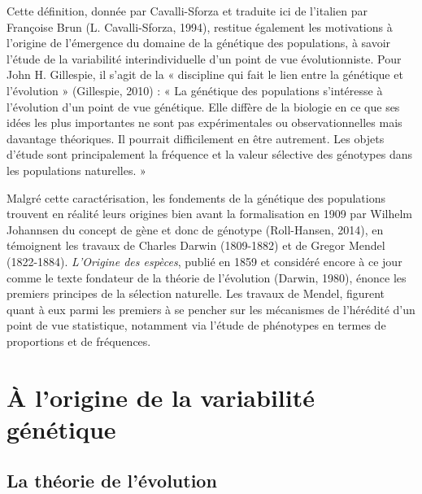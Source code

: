 \documentclass[12pt,twoside]{ugathesis}
\begin{document}
Cette définition, donnée par Cavalli-Sforza et traduite ici de l'italien
par Françoise Brun (L. Cavalli-Sforza, 1994), restitue également les
motivations à l'origine de l'émergence du domaine de la génétique des
populations, à savoir l'étude de la variabilité interindividuelle d'un
point de vue évolutionniste. Pour John H. Gillespie, il s'agit de la «
discipline qui fait le lien entre la génétique et l'évolution »
(Gillespie, 2010) : « La génétique des populations s'intéresse à
l'évolution d'un point de vue génétique. Elle diffère de la biologie en
ce que ses idées les plus importantes ne sont pas expérimentales ou
observationnelles mais davantage théoriques. Il pourrait difficilement
en être autrement. Les objets d'étude sont principalement la fréquence
et la valeur sélective des génotypes dans les populations naturelles. »

Malgré cette caractérisation, les fondements de la génétique des
populations trouvent en réalité leurs origines bien avant la
formalisation en 1909 par Wilhelm Johannsen du concept de gène et donc
de génotype (Roll-Hansen, 2014), en témoignent les travaux de Charles
Darwin (1809-1882) et de Gregor Mendel (1822-1884). \emph{L'Origine des
espèces}, publié en 1859 et considéré encore à ce jour comme le texte
fondateur de la théorie de l'évolution (Darwin, 1980), énonce les
premiers principes de la sélection naturelle. Les travaux de Mendel,
figurent quant à eux parmi les premiers à se pencher sur les mécanismes
de l'hérédité d'un point de vue statistique, notamment via l'étude de
phénotypes en termes de proportions et de fréquences.

\section{À l'origine de la variabilité
génétique}\label{a-lorigine-de-la-variabilite-genetique}

\subsection{La théorie de l'évolution}\label{la-theorie-de-levolution}
\end{document}
